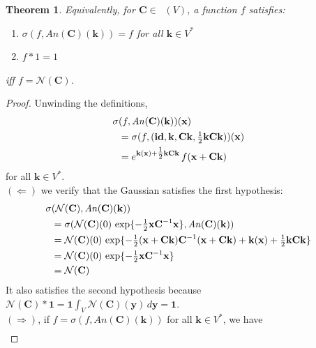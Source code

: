 \documentclass[12pt]{article}
\theoremstyle{definition}
\theoremstyle{plain}
\newtheorem{thm}{Theorem}
\newcommand{\Symp}{\mathop{\mathrm{Sym}_2^+}}
\newcommand{\id}{\mathop{\mathbf{id}}\nolimits}
\begin{document}
\pagebreak

\begin{thm} \label{thm:GaussChar}
    Equivalently, for $\mathbf{C}\in\Symp (V)$, a function $f$ satisfies:
    \begin{enumerate}
        \item $\sigma(f,\mathit{An}(\mathbf{C})(\mathbf{k}))=f$ for all $\mathbf{k} \in V^*$
        \item $f*1=1$
    \end{enumerate}
    iff $f=\mathcal{N}(\mathbf{C})$.
\end{thm}

\begin{proof}
    Unwinding the definitions, 
    \begin{align}
        &\hskip -6pt \sigma (f, \mathit{An}(\mathbf{C})(\mathbf{k}))(\mathbf{x}) \\ &= \sigma (f, (\id, \mathbf{k}, \mathbf{Ck}, \tfrac{1}{2} \mathbf{kCk}))(\mathbf{x}) \\
        &= e^{\mathbf{k} (\mathbf{x}) + \tfrac{1}{2} \mathbf{kCk}} \, f(\mathbf{x} + \mathbf{Ck})
    \end{align}
    for all \(\mathbf{k} \in V^*\). \\
    $(\Leftarrow)$ we verify that the Gaussian satisfies the first hypothesis:
    \begin{align}
        &\hskip -6pt \sigma (\mathcal{N}(\mathbf{C}), \mathit{An}(\mathbf{C})(\mathbf{k})) \\
        &= \sigma (\mathcal{N}(\mathbf{C})(0) \, \exp\{-\tfrac{1}{2} \mathbf{x} \mathbf{C}^{-1}\mathbf{x}\}, \mathit{An}(\mathbf{C})(\mathbf{k})) \\
        &= \mathcal{N}(\mathbf{C})(0) \, \exp \{-\tfrac{1}{2} (\mathbf{x} + \mathbf{Ck}) \mathbf{C}^{-1} (\mathbf{x} + \mathbf{Ck}) + \mathbf{k} (\mathbf{x}) + \tfrac{1}{2} \mathbf{kCk}\} \\
        &= \mathcal{N}(\mathbf{C})(0) \, \exp\{-\tfrac{1}{2} \mathbf{x} \mathbf{C}^{-1}\mathbf{x}\} \\
        &= \mathcal{N}(\mathbf{C})
    \end{align}
    It also satisfies the second hypothesis because \(\mathcal{N}(\mathbf{C}) * \boldsymbol{1} = \boldsymbol{1} \int_{V} \mathcal{N}(\mathbf{C}) (\mathbf{y}) \, d\mathbf{y} = \boldsymbol{1}\).\\
    $(\Rightarrow)$, if \(f = \sigma(f, \mathit{An}(\mathbf{C})(\mathbf{k}))\) for all \(\mathbf{k} \in V^*\), we have
    \begin{align}

\end{align}
\end{proof}
\end{document}
